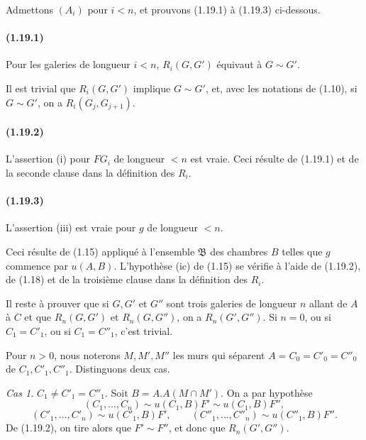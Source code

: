 \documentclass[10pt]{article}
\begin{document}
Admettons $(A_i)$ pour $i<n$, et prouvons (1.19.1) à (1.19.3) ci-dessous.

\paragraph{(1.19.1)} Pour les galeries de longueur $i<n$, $R_i(G,G')$ équivaut à $G\sim G'$.

Il est trivial que $R_i(G,G')$ implique $G\sim G'$, et, avec les notations de (1.10), si $G\sim G'$, on a $R_i(G_j,G_{j+1})$.

\paragraph{(1.19.2)} L'assertion (i) pour $FG_i$ de longueur $<n$ est vraie. Ceci résulte de (1.19.1) et de la seconde clause dans la définition des $R_i$.

\paragraph{(1.19.3)} L'assertion (iii) est vraie pour $g$ de longueur $<n$.

Ceci résulte de (1.15) appliqué à l'ensemble $\mathfrak B$ des chambres $B$ telles que $g$ commence par $u(A,B)$. L'hypothèse (ic) de (1.15) se vérifie à l'aide de (1.19.2), de (1.18) et de la troisième clause dans la définition des $R_i$.

Il reste à prouver que si $G,G'$ et $G''$ sont trois galeries de longueur $n$ allant de $A$ à $C$ et que $R_n(G,G')$ et $R_n(G,G'')$, on a $R_n(G',G'')$. Si $n=0$, ou si $C_1=C'_1$, ou si $C_1=C''_1$, c'est trivial.

Pour $n>0$, nous noterons $M,M',M''$ les murs qui séparent $A=C_0=C'_0=C''_0$ de $C_1,C'_1,C''_1$. Distinguons deux cas.

\emph{Cas 1.} $C_1\ne C'_1=C''_1$. Soit $B=A.A(M\cap M')$. On a par hypothèse
\[
(C_1,\ldots,C_n)\sim u(C_1,B)F'\sim u(C_1,B)F'',
\]
\[
(C'_1,\ldots,C'_n)\sim u(C'_1,B)F',\qquad
(C''_1,\ldots,C''_n)\sim u(C''_1,B)F''.
\]
De (1.19.2), on tire alors que $F'\sim F''$, et donc que $R_n(G',G'')$.
\end{document}

